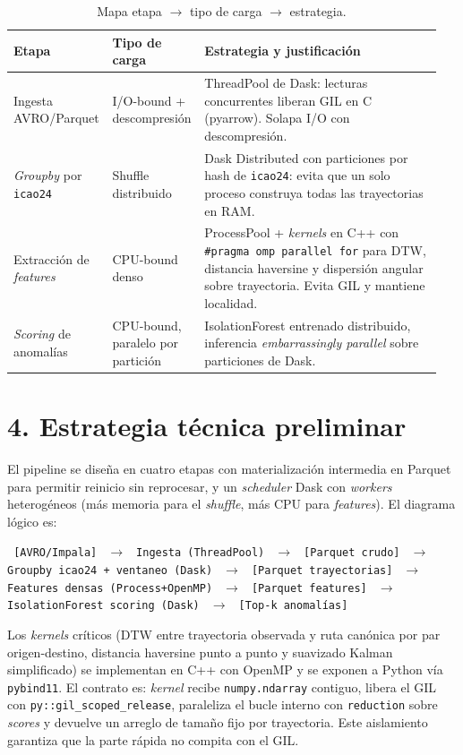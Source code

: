 \documentclass[letterpaper,11pt]{article}
\begin{document}
\begin{table}[H]
\centering
\caption{Mapa etapa $\to$ tipo de carga $\to$ estrategia.}
\begin{tabular}{p{0.20\linewidth} p{0.20\linewidth} p{0.55\linewidth}}
\toprule
Etapa & Tipo de carga & Estrategia y justificación \\
\midrule
Ingesta AVRO/Parquet & I/O-bound + descompresión & ThreadPool de Dask: lecturas concurrentes liberan GIL en C (pyarrow). Solapa I/O con descompresión. \\
\textit{Groupby} por \texttt{icao24} & Shuffle distribuido & Dask Distributed con particiones por hash de \texttt{icao24}: evita que un solo proceso construya todas las trayectorias en RAM. \\
Extracción de \textit{features} & CPU-bound denso & ProcessPool + \textit{kernels} en C++ con \texttt{\#pragma omp parallel for} para DTW, distancia haversine y dispersión angular sobre trayectoria. Evita GIL y mantiene localidad. \\
\textit{Scoring} de anomalías & CPU-bound, paralelo por partición & IsolationForest entrenado distribuido, inferencia \textit{embarrassingly parallel} sobre particiones de Dask. \\
\bottomrule
\end{tabular}
\end{table}

\section*{4. Estrategia técnica preliminar}

El pipeline se diseña en cuatro etapas con materialización intermedia en Parquet para permitir reinicio sin reprocesar, y un \textit{scheduler} Dask con \textit{workers} heterogéneos (más memoria para el \textit{shuffle}, más CPU para \textit{features}). El diagrama lógico es:

\begin{center}
\small\texttt{
[AVRO/Impala]
$\;\to\;$ Ingesta (ThreadPool) $\;\to\;$ [Parquet crudo]
$\;\to\;$ Groupby icao24 + ventaneo (Dask) $\;\to\;$ [Parquet trayectorias]
$\;\to\;$ Features densas (Process+OpenMP) $\;\to\;$ [Parquet features]
$\;\to\;$ IsolationForest scoring (Dask) $\;\to\;$ [Top-k anomalías]
}
\end{center}

Los \textit{kernels} críticos (DTW entre trayectoria observada y ruta canónica por par origen-destino, distancia haversine punto a punto y suavizado Kalman simplificado) se implementan en C++ con OpenMP y se exponen a Python vía \texttt{pybind11}. El contrato es: \textit{kernel} recibe \texttt{numpy.ndarray} contiguo, libera el GIL con \texttt{py::gil\_scoped\_release}, paraleliza el bucle interno con \texttt{reduction} sobre \textit{scores} y devuelve un arreglo de tamaño fijo por trayectoria. Este aislamiento garantiza que la parte rápida no compita con el GIL.
\end{document}
